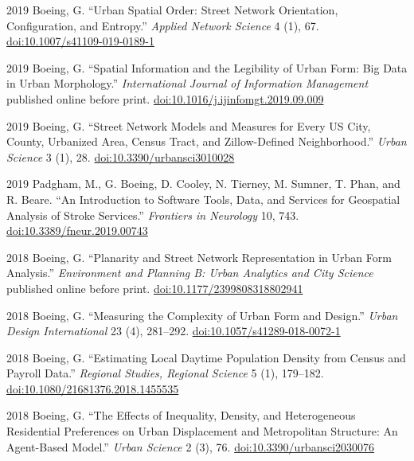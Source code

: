 \documentclass[12pt,letterpaper]{report}
\begin{document}
\begin{tablist}
    	\item[2019] \tab Boeing, G. \enquote{Urban Spatial Order: Street Network Orientation, Configuration, and Entropy.} \textit{Applied Network Science} 4 (1), 67. \href{https://doi.org/10.1007/s41109-019-0189-1}{doi:10.1007/s41109-019-0189-1}
    	
    	\item[2019] \tab Boeing, G. \enquote{Spatial Information and the Legibility of Urban Form: Big Data in Urban Morphology.} \textit{International Journal of Information Management} published online before print. \href{https://doi.org/10.1016/j.ijinfomgt.2019.09.009}{doi:10.1016/j.ijinfomgt.2019.09.009} 
		
        \item[2019] \tab Boeing, G. \enquote{Street Network Models and Measures for Every US City, County, Urbanized Area, Census Tract, and Zillow-Defined Neighborhood.} \textit{Urban Science} 3 (1), 28. \href{https://doi.org/10.3390/urbansci3010028}{doi:10.3390/urbansci3010028}
        
        \item[2019] \tab Padgham, M., G. Boeing, D. Cooley, N. Tierney, M. Sumner, T. Phan, and R. Beare. \enquote{An Introduction to Software Tools, Data, and Services for Geospatial Analysis of Stroke Services.} \textit{Frontiers in Neurology} 10, 743. \href{https://doi.org/10.3389/fneur.2019.00743}{doi:10.3389/fneur.2019.00743}

        \item[2018] \tab Boeing, G. \enquote{Planarity and Street Network Representation in Urban Form Analysis.} \textit{Environment and Planning B: Urban Analytics and City Science} published online before print. \href{https://doi.org/10.1177/2399808318802941}{doi:10.1177/2399808318802941}

        \item[2018] \tab Boeing, G. \enquote{Measuring the Complexity of Urban Form and Design.} \textit{Urban Design International} 23 (4), 281--292. \href{https://doi.org/10.1057/s41289-018-0072-1}{doi:10.1057/s41289-018-0072-1}

        \item[2018] \tab Boeing, G. \enquote{Estimating Local Daytime Population Density from Census and Payroll Data.} \textit{Regional Studies, Regional Science} 5 (1), 179--182. \href{https://doi.org/10.1080/21681376.2018.1455535}{doi:10.1080/21681376.2018.1455535}

        \item[2018] \tab Boeing, G. \enquote{The Effects of Inequality, Density, and Heterogeneous Residential Preferences on Urban Displacement and Metropolitan Structure: An Agent-Based Model.} \textit{Urban Science} 2 (3), 76. \href{https://doi.org/10.3390/urbansci2030076}{doi:10.3390/urbansci2030076}


\end{tablist}
\end{document}

